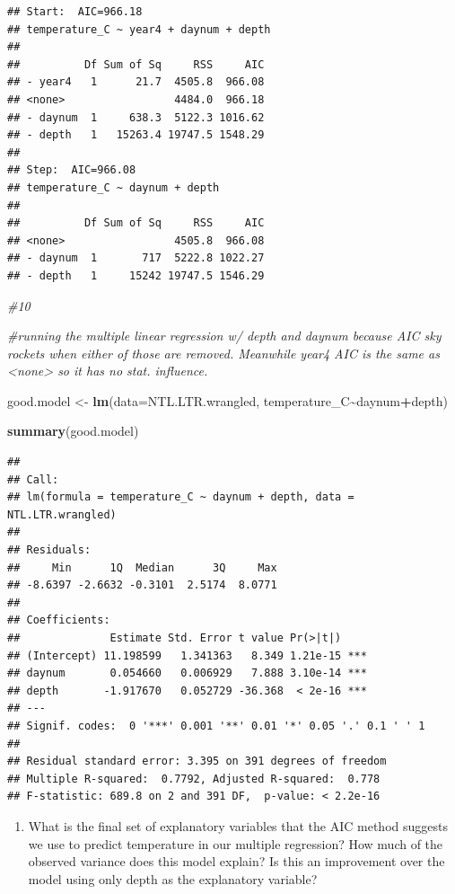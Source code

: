 \documentclass[
]{article}
\newenvironment{Shaded}{\begin{snugshade}}{\end{snugshade}}
\newcommand{\AttributeTok}[1]{\textcolor[rgb]{0.13,0.29,0.53}{#1}}
\newcommand{\CommentTok}[1]{\textcolor[rgb]{0.56,0.35,0.01}{\textit{#1}}}
\newcommand{\FunctionTok}[1]{\textcolor[rgb]{0.13,0.29,0.53}{\textbf{#1}}}
\newcommand{\NormalTok}[1]{#1}
\newcommand{\OtherTok}[1]{\textcolor[rgb]{0.56,0.35,0.01}{#1}}
\newcommand{\SpecialCharTok}[1]{\textcolor[rgb]{0.81,0.36,0.00}{\textbf{#1}}}
\providecommand{\tightlist}{%
  \setlength{\itemsep}{0pt}\setlength{\parskip}{0pt}}
\begin{document}
\begin{verbatim}
## Start:  AIC=966.18
## temperature_C ~ year4 + daynum + depth
## 
##          Df Sum of Sq     RSS     AIC
## - year4   1      21.7  4505.8  966.08
## <none>                 4484.0  966.18
## - daynum  1     638.3  5122.3 1016.62
## - depth   1   15263.4 19747.5 1548.29
## 
## Step:  AIC=966.08
## temperature_C ~ daynum + depth
## 
##          Df Sum of Sq     RSS     AIC
## <none>                 4505.8  966.08
## - daynum  1       717  5222.8 1022.27
## - depth   1     15242 19747.5 1546.29
\end{verbatim}

\begin{Shaded}
\begin{Highlighting}[]
\CommentTok{\#10}

\CommentTok{\#running the multiple linear regression  w/ depth and daynum because AIC sky rockets when either of those are removed. Meanwhile year4 AIC is the same as \textless{}none\textgreater{} so it has no stat. influence. }

\NormalTok{good.model }\OtherTok{\textless{}{-}} \FunctionTok{lm}\NormalTok{(}\AttributeTok{data=}\NormalTok{NTL.LTR.wrangled, temperature\_C}\SpecialCharTok{\textasciitilde{}}\NormalTok{daynum}\SpecialCharTok{+}\NormalTok{depth)}

\FunctionTok{summary}\NormalTok{(good.model)}
\end{Highlighting}
\end{Shaded}

\begin{verbatim}
## 
## Call:
## lm(formula = temperature_C ~ daynum + depth, data = NTL.LTR.wrangled)
## 
## Residuals:
##     Min      1Q  Median      3Q     Max 
## -8.6397 -2.6632 -0.3101  2.5174  8.0771 
## 
## Coefficients:
##              Estimate Std. Error t value Pr(>|t|)    
## (Intercept) 11.198599   1.341363   8.349 1.21e-15 ***
## daynum       0.054660   0.006929   7.888 3.10e-14 ***
## depth       -1.917670   0.052729 -36.368  < 2e-16 ***
## ---
## Signif. codes:  0 '***' 0.001 '**' 0.01 '*' 0.05 '.' 0.1 ' ' 1
## 
## Residual standard error: 3.395 on 391 degrees of freedom
## Multiple R-squared:  0.7792, Adjusted R-squared:  0.778 
## F-statistic: 689.8 on 2 and 391 DF,  p-value: < 2.2e-16
\end{verbatim}

\begin{enumerate}
\def\labelenumi{\arabic{enumi}.}
\setcounter{enumi}{10}
\tightlist
\item
  What is the final set of explanatory variables that the AIC method
  suggests we use to predict temperature in our multiple regression? How
  much of the observed variance does this model explain? Is this an
  improvement over the model using only depth as the explanatory
  variable?
\end{enumerate}
\end{document}
